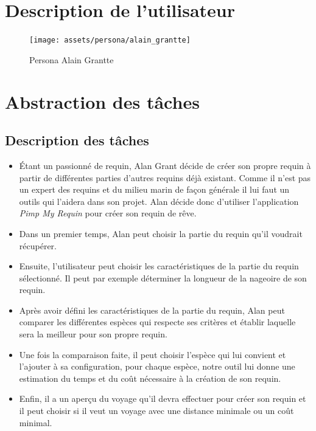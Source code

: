 \documentclass{article}
\begin{document}
\clearpage
\section{Description de l’utilisateur}

\begin{figure}[!h]
	\centering
	\texttt{[image: assets/persona/alain\_grantte]}
	\caption{\label{assets/persona/alain_grantte} Persona Alain Grantte}
\end{figure}

\newpage
\section{Abstraction des tâches}

\subsection{Description des tâches}
\begin{itemize}
    \item Étant un passionné de requin, Alan Grant décide de créer son propre requin à partir de différentes parties d'autres requins déjà existant. Comme il n'est pas un expert des requins et du milieu marin de façon générale il lui faut un outils qui l'aidera dans son projet. Alan décide donc d'utiliser l'application \textit{Pimp My Requin} pour créer son requin de rêve.
    \item Dans un premier temps, Alan peut choisir la partie du requin qu'il voudrait récupérer.
    \item Ensuite, l'utilisateur peut choisir les caractéristiques de la partie du requin sélectionné. Il peut par exemple déterminer la longueur de la nageoire de son requin.
    \item Après avoir défini les caractéristiques de la partie du requin, Alan peut comparer les différentes espèces qui respecte ses critères et établir laquelle sera la meilleur pour son propre requin. 
    \item Une fois la comparaison faite, il peut choisir l'espèce qui lui convient et l'ajouter à sa configuration, pour chaque espèce, notre outil lui donne une estimation du temps et du coût nécessaire à la création de son requin.
    \item Enfin, il a un aperçu du voyage qu'il devra effectuer pour créer son requin et il peut choisir si il veut un voyage avec une distance minimale ou un coût minimal.
\end{itemize}
\end{document}
